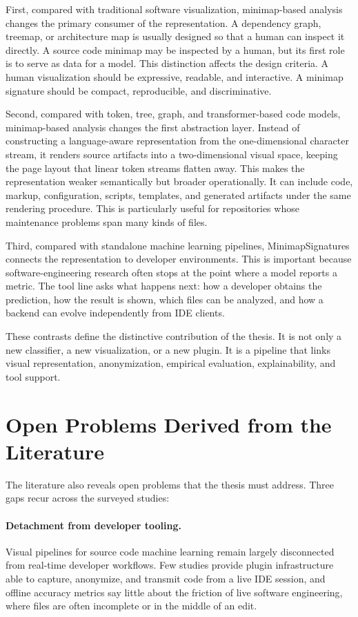 First, compared with traditional software visualization, minimap-based analysis
changes the primary consumer of the representation. A dependency graph, treemap,
or architecture map is usually designed so that a human can inspect it directly.
A source code minimap may be inspected by a human, but its first role is to
serve as data for a model. This distinction affects the design criteria. A human
visualization should be expressive, readable, and interactive. A minimap
signature should be compact, reproducible, and discriminative.

Second, compared with token, tree, graph, and transformer-based code models,
minimap-based analysis changes the first abstraction layer. Instead of
constructing a language-aware representation from the one-dimensional character
stream, it renders source artifacts into a two-dimensional visual space,
keeping the page layout that linear token streams flatten away. This makes the
representation weaker semantically but broader operationally. It can include code, markup, configuration, scripts, templates,
and generated artifacts under the same rendering procedure. This is particularly
useful for repositories whose maintenance problems span many kinds of files.

Third, compared with standalone machine learning pipelines, MinimapSignatures
connects the representation to developer environments. This is important because
software-engineering research often stops at the point where a model reports a
metric. The tool line asks what happens next: how a developer obtains the
prediction, how the result is shown, which files can be analyzed, and how a
backend can evolve independently from IDE clients.

These contrasts define the distinctive contribution of the thesis. It is not
only a new classifier, a new visualization, or a new plugin. It is a pipeline
that links visual representation, anonymization, empirical evaluation,
explainability, and tool support.

\section{Open Problems Derived from the Literature}

The literature also reveals open problems that the thesis must address. Three
gaps recur across the surveyed studies:

\paragraph{Detachment from developer tooling.}
Visual pipelines for source code machine learning remain largely disconnected
from real-time developer workflows. Few studies provide plugin infrastructure
able to capture, anonymize, and transmit code from a live IDE session, and
offline accuracy metrics say little about the friction of live software
engineering, where files are often incomplete or in the middle of an edit.

